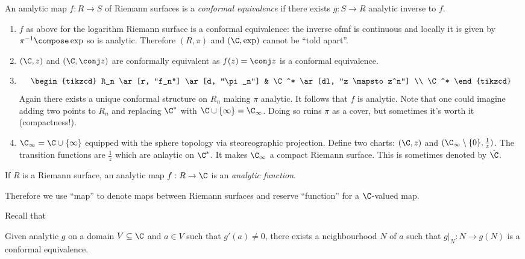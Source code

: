 \documentclass[a4paper]{article}
\begin{document}
\begin{definition}
  An analytic map \(f: R \to S\) of Riemann surfaces is a \emph{conformal equivalence} if there exists \(g: S \to R\) analytic inverse to \(f\).
\end{definition}

\begin{eg}\leavevmode
  \begin{enumerate}
  \item \(f\) as above for the logarithm Riemann surface is a conformal equivalence: the inverse ofmf is continuous and locally it is given by \(\pi^{-1} \compose \exp\) so is analytic. Therefore \((R, \pi)\) and \((\C, \exp)\) cannot be ``told apart''.
  \item \((\C, z)\) and \((\C, \conj z)\) are conformally equivalent as \(f(z) = \conj z\) is a conformal equivalence.
  \item
    \[
      \begin{tikzcd}
        R_n \ar[r, "f_n"] \ar[d, "\pi_n"] & \C^* \ar[dl, "z \mapsto z^n"] \\
        \C^*
      \end{tikzcd}
    \]
    Again there exists a unique conformal structure on \(R_n\) making \(\pi\) analytic. It follows that \(f\) is analytic. Note that one could imagine adding two points to \(R_n\) and replacing \(\C^*\) with \(\C \cup \{\infty\} = \C_\infty\). Doing so ruins \(\pi\) as a cover, but sometimes it's worth it (compactness!).
  \item \(\C_\infty = \C \cup \{\infty\}\) equipped with the sphere topology via steoreographic projection. Define two charts: \((\C, z)\) and \((\C_\infty \setminus \{0\}, \frac{1}{z})\). The transition functions are \(\frac{1}{z}\) which are anlaytic on \(\C^*\). It makes \(\C_\infty\) a compact Riemann surface. This is sometimes denoted by \(\hat \C\).
  \end{enumerate}
\end{eg}

\begin{definition}
  If \(R\) is a Riemann surface, an analytic map \(f: R \to \C\) is an \emph{analytic function}.
\end{definition}

Therefore we use ``map'' to denote maps between Riemann surfaces and reserve ``function'' for a \(\C\)-valued map.

Recall that

\begin{theorem}
  Given analytic \(g\) on a domain \(V \subseteq \C\) and \(a \in V\) such that \(g'(a) \neq 0\), there exists a neighbourhood \(N\) of \(a\) such that \(g|_N : N \to g(N)\) is a conformal equivalence.
\end{theorem}
\end{document}
